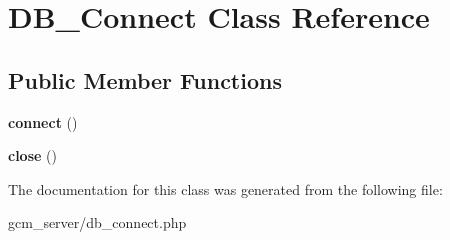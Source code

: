 \hypertarget{class_d_b___connect}{}\section{D\+B\+\_\+\+Connect Class Reference}
\label{class_d_b___connect}
\subsection*{Public Member Functions}
\begin{DoxyCompactItemize}
\item 
\hypertarget{class_d_b___connect_a2fd9ffbcd6b66d615975e48405e0e8af}{}{\bfseries connect} ()\label{class_d_b___connect_a2fd9ffbcd6b66d615975e48405e0e8af}

\item 
\hypertarget{class_d_b___connect_a2f99fe1cdc46c4b7e56a6457b1133a6a}{}{\bfseries close} ()\label{class_d_b___connect_a2f99fe1cdc46c4b7e56a6457b1133a6a}

\end{DoxyCompactItemize}


The documentation for this class was generated from the following file\+:\begin{DoxyCompactItemize}
\item 
gcm\+\_\+server/db\+\_\+connect.\+php\end{DoxyCompactItemize}
